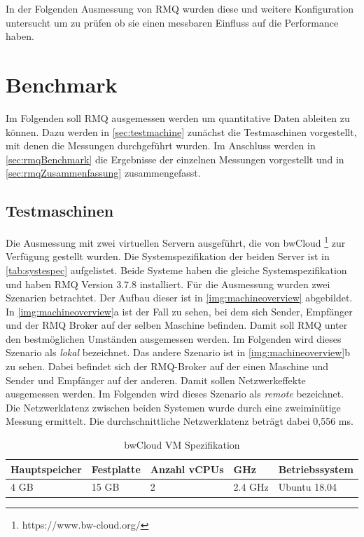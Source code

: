 In der Folgenden Ausmessung von RMQ wurden diese und weitere Konfiguration untersucht um zu prüfen ob sie einen messbaren Einfluss auf die Performance haben.

\section{Benchmark}
Im Folgenden soll RMQ ausgemessen werden um quantitative Daten ableiten zu können. Dazu werden in \autoref{sec:testmachine} zunächst die Testmaschinen vorgestellt, mit denen die Messungen durchgeführt wurden. Im Anschluss werden in \autoref{sec:rmqBenchmark} die Ergebnisse der einzelnen Messungen vorgestellt und in \autoref{sec:rmqZusammenfassung} zusammengefasst.

\subsection{Testmaschinen}
\label{sec:testmachine}
Die Ausmessung mit zwei virtuellen Servern ausgeführt, die von bwCloud \footnote{https://www.bw-cloud.org/} zur Verfügung gestellt wurden. Die Systemspezifikation der beiden Server ist in \autoref{tab:systespec} aufgelistet. Beide Systeme haben die gleiche Systemspezifikation und haben RMQ Version 3.7.8 installiert. Für die Ausmessung wurden zwei Szenarien betrachtet. Der Aufbau dieser ist in \autoref{img:machineoverview} abgebildet. In \autoref{img:machineoverview}a ist der Fall zu sehen, bei dem sich Sender, Empfänger und der RMQ Broker auf der selben Maschine befinden. Damit soll RMQ unter den bestmöglichen Umständen ausgemessen werden. Im Folgenden wird dieses Szenario als \textit{lokal} bezeichnet. Das andere Szenario ist in \autoref{img:machineoverview}b zu sehen. Dabei befindet sich der RMQ-Broker auf der einen Maschine und Sender und Empfänger auf der anderen. Damit sollen Netzwerkeffekte ausgemessen werden. Im Folgenden wird dieses Szenario als \textit{remote} bezeichnet. Die Netzwerklatenz zwischen beiden Systemen wurde durch eine zweiminütige Messung ermittelt. Die durchschnittliche Netzwerklatenz beträgt dabei 0,556 ms. 

\begin{table}
  \centering
  \begin{tabular}{|l|l|l|l|l|}
    Hauptspeicher & Festplatte & Anzahl vCPUs & GHz & Betriebssystem \\
    \hline
     4 GB & 15 GB & 2 & 2.4 GHz & Ubuntu 18.04
  \end{tabular}
	\caption{\label{tab:systespec} bwCloud VM Spezifikation}
\end{table}

